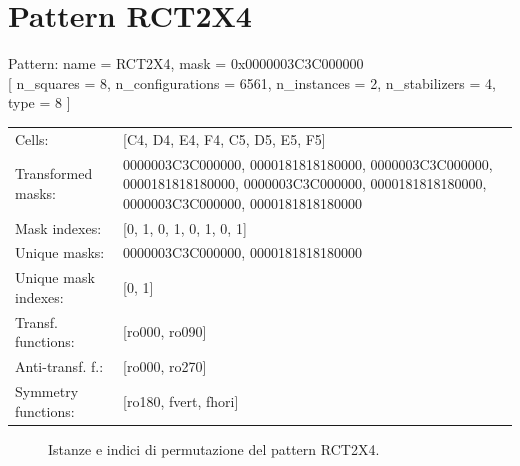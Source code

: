 \newpage

\section{Pattern RCT2X4}

\begin{tcolorbox}[sharp corners, fontupper=\ttfamily\small, colback=white]
  \noindent Pattern: name = RCT2X4, mask = 0x0000003C3C000000\\
  {[} n\_squares = 8, n\_configurations = 6561,
  n\_instances = 2, n\_stabilizers = 4, type = 8 { ]}\\[1.0ex]
  \begin{tabularx}{\textwidth}{@{} p{3.5cm} X @{}}
    Cells:               & {[}C4, D4, E4, F4, C5, D5, E5, F5{]}\\[0.5ex]
    Transformed masks:   & 0000003C3C000000, 0000181818180000, 0000003C3C000000, 0000181818180000, 0000003C3C000000, 0000181818180000, 0000003C3C000000, 0000181818180000\\[0.5ex]
    Mask indexes:        & {[}0, 1, 0, 1, 0, 1, 0, 1{]}\\[0.5ex]
    Unique masks:        & 0000003C3C000000, 0000181818180000\\[0.5ex]
    Unique mask indexes: & {[}0, 1{]}\\[0.5ex]
    Transf. functions:   & {[}ro000, ro090{]}\\[0.5ex]
    Anti-transf. f.:     & {[}ro000, ro270{]}\\[0.5ex]
    Symmetry functions:  & {[}ro180, fvert, fhori{]}\\[0.5ex]
  \end{tabularx}
\end{tcolorbox}

\begin{figure}[htbp]
  \centering
   \hfill
   \hfill
   \hfill
  \vspace{0.3cm}
   \hfill
   \hfill
   \hfill
  \caption{Istanze e indici di permutazione del pattern RCT2X4.}
\end{figure}

